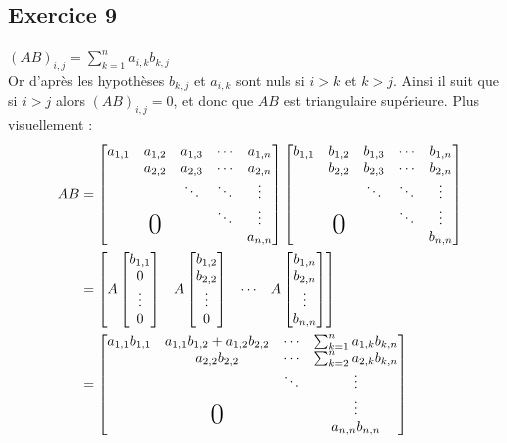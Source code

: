 \documentclass{article}
\newcommand{\bigzero}{\makebox(0,0){\text{\huge0}}}
\begin{document}
\subsection*{Exercice 9}
\noindent $(AB)_{i,j}=\displaystyle\sum_{k=1}^{n}a_{i,k}b_{k,j}$ \\
Or d'après les hypothèses $b_{k,j}$ et $a_{i,k}$ sont nuls si $i>k$ et $k>j$. Ainsi il suit que si $i>j$ alors $(AB)_{i,j}=0$, et donc que $AB$ est triangulaire supérieure. Plus visuellement :
\begin{align*}
AB &= \begin{bmatrix}
a_{1,1} & a_{1,2} & a_{1,3} & \cdots & a_{1,n} \\
  & a_{2,2} & a_{2,3} & \cdots & a_{2,n} \\
  &   & \ddots & \ddots & \vdots \\
  & \bigzero  &  & \ddots & \vdots \\
  &   &   &  & a_{n,n}
\end{bmatrix}
 \begin{bmatrix}
b_{1,1} & b_{1,2} & b_{1,3} & \cdots & b_{1,n} \\
  & b_{2,2} & b_{2,3} & \cdots & b_{2,n} \\
  &   & \ddots & \ddots & \vdots \\
  & \bigzero  &  & \ddots & \vdots \\
  &   &   &  & b_{n,n}
\end{bmatrix}\\
&= \begin{bmatrix}
A\begin{bmatrix}
b_{1,1} \\ 0 \\ \vdots \\ 0
\end{bmatrix} & 
A\begin{bmatrix}
b_{1,2} \\ b_{2,2} \\ \vdots \\ 0
\end{bmatrix} &
\cdots &
A \begin{bmatrix}
b_{1,n} \\ b_{2,n} \\ \vdots\\ b_{n,n}
\end{bmatrix}
\end{bmatrix}\\
&= \begin{bmatrix}
a_{1,1}b_{1,1} &a_{1,1} b_{1,2} + a_{1,2}b_{2,2}  & \cdots & \sum_{k = 1}^n a_{1, k}b_{k, n} \\
  & a_{2,2}b_{2,2}  & \cdots & \sum_{k = 2}^n a_{2,k}b_{k,n} \\
  &   & \ddots & \vdots \\
  & \bigzero  & & \vdots \\
  &   &   &   a_{n,n}b_{n,n}
\end{bmatrix}
\end{align*}
\end{document}
